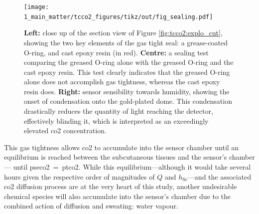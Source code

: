 \begin{figure}
	\centering
	\texttt{[image: 1\_main\_matter/tcco2\_figures/tikz/out/fig\_sealing.pdf]}
	\caption[Sensor sealing analysis.]{\textbf{Left:} close up of the section view of Figure \ref{fig:tcco2:explo_cut}, showing the two key elements of the gas tight seal: a grease-coated O-ring, and cast epoxy resin (in red). \textbf{Centre:} a sealing test comparing the greased O-ring alone with the greased O-ring and the cast epoxy resin. This test clearly indicates that the greased O-ring alone does not accomplish gas tightness, whereas the cast epoxy resin does. \textbf{Right:} sensor sensibility towards humidity, showing the onset of condensation onto the gold-plated dome. This condensation drastically reduces the quantity of light reaching the detector, effectively blinding it, which is interpreted as an exceedingly elevated \gls{co2} concentration.}\label{fig:tcco2:gas_tightness}
\end{figure}

This gas tightness allows \gls{co2} to accumulate into the sensor chamber until an equilibrium is reached between the subcutaneous tissues and the sensor's chamber---\ie{} until \gls{pseco2}~=~\gls{ptco2}. While this equilibrium---although it would take several hours given the respective order of magnitudes of $Q$ and $h_\text{Se}$---and the associated \gls{co2} diffusion process are at the very heart of this study, another undesirable chemical species will also accumulate into the sensor's chamber due to the combined action of diffusion and sweating: water vapour.

